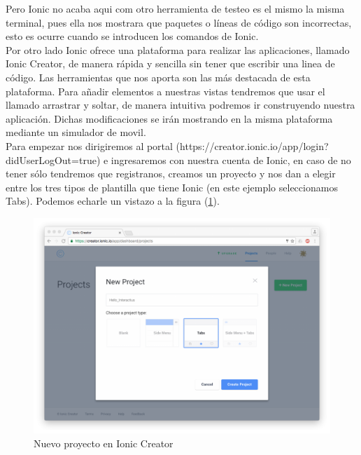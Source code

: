 \documentclass[a4paper, 11pt]{article}
\begin{document}
\begin{itemize}
              Pero Ionic no acaba aqui com otro herramienta de testeo es el mismo
              la misma terminal, pues ella nos mostrara que paquetes o líneas de
              código son incorrectas, esto es ocurre cuando se introducen los
              comandos de Ionic.\\

              Por otro lado Ionic ofrece una plataforma para realizar las
              aplicaciones, llamado Ionic Creator, de manera rápida y sencilla
              sin tener que escribir una linea de código. Las herramientas que
              nos aporta son las más destacada de esta plataforma. Para añadir
              elementos a nuestras vistas tendremos que usar el llamado
              arrastrar y soltar, de manera intuitiva podremos ir construyendo
              nuestra aplicación. Dichas modificaciones se irán mostrando en la
              misma plataforma mediante un simulador de movil.\\

              Para empezar nos dirigiremos al portal (https://creator.ionic.io/app/login?didUserLogOut=true)
              e ingresaremos con nuestra cuenta de Ionic, en caso de no tener
              sólo tendremos que registranos, creamos un proyecto y nos dan a
              elegir entre los tres tipos de plantilla que tiene Ionic (en este
              ejemplo seleccionamos Tabs). Podemos echarle un vistazo a la figura
              (\ref{f:creator1}).\\
              \begin{figure}[H]
                \centering
                     \includegraphics[width=\textwidth]{creator1}
                     \caption{Nuevo proyecto en Ionic Creator}
                     \label{f:creator1}
               \end{figure}


\end{itemize}
\end{document}
